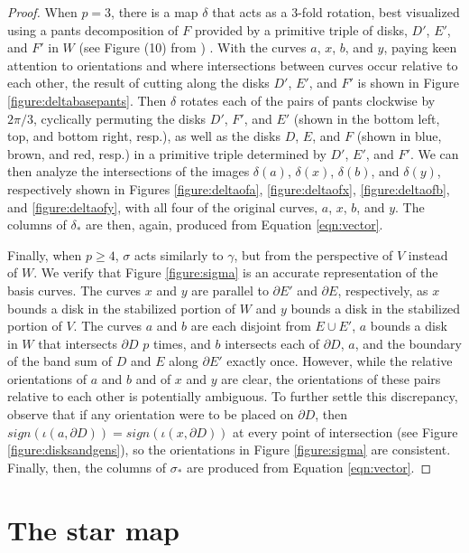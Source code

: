 \documentclass{amsart}     %
\newcommand{\bd}{\partial}
\newcommand{\io}{\iota}
\theoremstyle{definition}
\begin{document}
\begin{proof}
When $p = 3$, there is a map $\delta$ that acts as a 3-fold rotation, best visualized using a pants decomposition of $F$ provided by a primitive triple of disks, $D'$, $E'$, and $F'$ in $W$ (see Figure (10) from \cite{ChoG2GGLS}) . With the curves $a$, $x$, $b$, and $y$, paying keen attention to orientations and where intersections between curves occur relative to each other, the result of cutting along the disks $D'$, $E'$, and $F'$ is shown in Figure \ref{figure:deltabasepants}. Then $\delta$ rotates each of the pairs of pants clockwise by $2\pi/3$, cyclically permuting the disks $D'$, $F'$, and $E'$ (shown in the bottom left, top, and bottom right, resp.), as well as the disks $D$, $E$, and $F$ (shown in blue, brown, and red, resp.) in a primitive triple determined by $D'$, $E'$, and $F'$. We can then analyze the intersections of the images $\delta(a)$, $\delta(x)$, $\delta(b)$, and $\delta(y)$, respectively shown in Figures \ref{figure:deltaofa}, \ref{figure:deltaofx}, \ref{figure:deltaofb}, and \ref{figure:deltaofy}, with all four of the original curves, $a$, $x$, $b$, and $y$. The columns of $\delta_*$ are then, again, produced from Equation \ref{eqn:vector}.

Finally, when $p \geq 4$, $\sigma$ acts similarly to $\gamma$, but from the perspective of $V$ instead of $W$. We verify that Figure \ref{figure:sigma} is an accurate representation of the basis curves. The curves $x$ and $y$ are parallel to $\bd E'$ and $\bd E$, respectively, as $x$ bounds a disk in the stabilized portion of $W$ and $y$ bounds a disk in the stabilized portion of $V$. The curves $a$ and $b$ are each disjoint from $E \cup E'$, $a$ bounds a disk in $W$ that intersects $\bd D$ $p$ times, and $b$ intersects each of $\bd D$, $a$, and the boundary of the band sum of $D$ and $E$ along $\bd E'$ exactly once. However, while the relative orientations of $a$ and $b$ and of $x$ and $y$ are clear, the orientations of these pairs relative to each other is potentially ambiguous. To further settle this discrepancy, observe that if any orientation were to be placed on $\bd D$, then $sign ( \io(a, \bd D) ) = sign( \io(x, \bd D) )$ at every point of intersection (see Figure \ref{figure:disksandgens}), so the orientations in Figure \ref{figure:sigma} are consistent. Finally, then, the columns of $\sigma_*$ are produced from Equation \ref{eqn:vector}.
\end{proof}


\section{The star map}
\label{section:Star}
\end{document}
